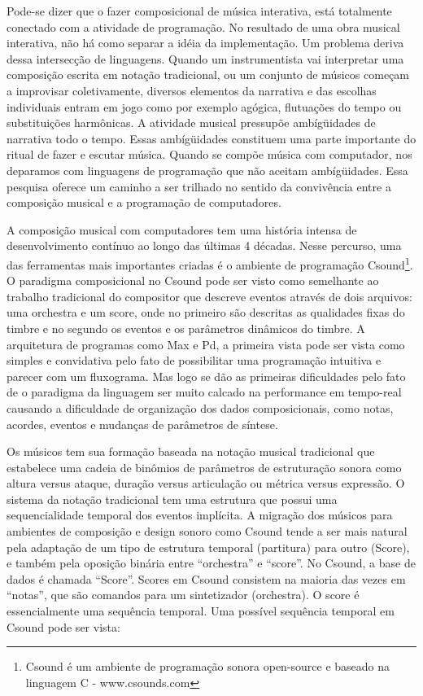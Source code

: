 \documentclass{ppgmus}
\begin{document}
Pode-se dizer que o fazer composicional de música interativa, está 
totalmente conectado com a atividade de programação. No resultado de uma
obra musical interativa, não há como separar a idéia da implementação. Um 
problema deriva dessa intersecção de linguagens. Quando um instrumentista
vai interpretar uma composição escrita em notação tradicional, ou um conjunto de 
músicos começam a improvisar coletivamente, diversos elementos da narrativa e 
das escolhas individuais entram em jogo como por exemplo agógica, flutuações do tempo ou
 substituições harmônicas. A atividade musical pressupõe ambígüidades de narrativa todo o tempo.
Essas ambígüidades constituem uma parte importante do ritual de fazer
e escutar música. Quando se compõe música com computador,  nos
deparamos com linguagens de programação que não aceitam ambígüidades.
Essa pesquisa oferece um caminho a ser trilhado no sentido da convivência
entre a composição musical e a programação de computadores.

A composição musical com computadores tem uma história intensa de desenvolvimento
contínuo ao longo das últimas 4 décadas. Nesse percurso, uma das ferramentas mais
importantes criadas é o ambiente de programação Csound\footnote{Csound é um ambiente de programação
sonora open-source e baseado na linguagem C - www.csounds.com}.
O paradigma composicional no Csound pode ser visto como semelhante ao
trabalho tradicional do compositor que descreve eventos através de
dois arquivos: uma orchestra e um score, onde no primeiro são
descritas as qualidades fixas do timbre e no segundo os eventos e os
parâmetros dinâmicos do timbre. A arquitetura de programas como Max e
Pd, a primeira vista pode ser vista como simples e convidativa pelo
fato de possibilitar uma programação intuitiva e parecer com um
fluxograma. Mas logo se dão as primeiras dificuldades pelo fato de o
paradigma da linguagem ser muito calcado na performance em tempo-real
causando a dificuldade de organização dos dados composicionais, como
notas, acordes, eventos e mudanças de parâmetros de síntese.

Os músicos tem sua formação baseada na notação musical tradicional que
estabelece uma cadeia de binômios de parâmetros de estruturação sonora
\cite{zampronha00:notacao} como altura versus ataque, duração versus
articulação ou métrica versus expressão. O sistema da notação
tradicional tem uma estrutura que possui uma sequencialidade temporal
dos eventos implícita. A migração dos músicos para ambientes de
composição e design sonoro como Csound \cite{boulanger00:csound} tende
a ser mais natural pela adaptação de um tipo de estrutura temporal
(partitura) para outro (Score), e também pela oposição binária entre
``orchestra'' e ``score''. No Csound, a base de dados é chamada
``Score''. Scores em Csound consistem na maioria das vezes em
``notas'', que são comandos para um sintetizador (orchestra). O score
é essencialmente uma sequência temporal. Uma possível sequência
temporal em Csound pode ser vista:
\end{document}
